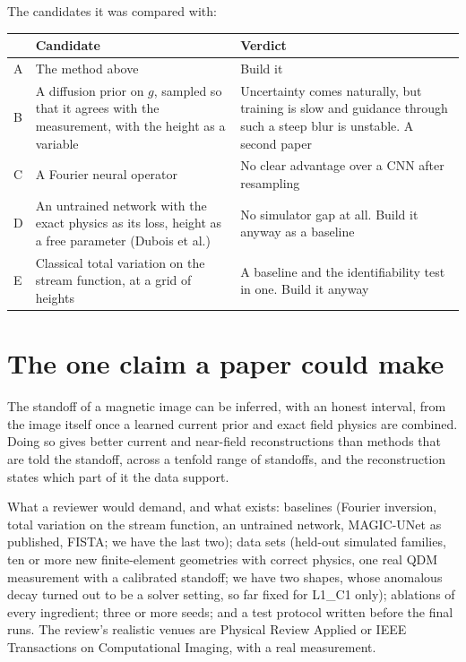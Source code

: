 The candidates it was compared with:

\begin{center}
\small
\begin{tabularx}{\textwidth}{l>{\raggedright\arraybackslash}X>{\raggedright\arraybackslash}p{3.6cm}}
\toprule
 & Candidate & Verdict \\
\midrule
A & The method above & Build it \\
B & A diffusion prior on $g$, sampled so that it agrees with the measurement, with the height as a variable & Uncertainty
comes naturally, but training is slow and guidance through such a steep blur is unstable. A second paper \\
C & A Fourier neural operator & No clear advantage over a CNN after resampling \\
D & An untrained network with the exact physics as its loss, height as a free parameter (Dubois et al.) & No simulator gap
at all. Build it anyway as a baseline \\
E & Classical total variation on the stream function, at a grid of heights & A baseline and the identifiability test in
one. Build it anyway \\
\bottomrule
\end{tabularx}
\end{center}

\section{The one claim a paper could make}

\begin{keyidea}
The standoff of a magnetic image can be inferred, with an honest interval, from the image itself once a learned current
prior and exact field physics are combined. Doing so gives better current and near-field reconstructions than methods
that are told the standoff, across a tenfold range of standoffs, and the reconstruction states which part of it the data
support.
\end{keyidea}

What a reviewer would demand, and what exists: baselines (Fourier inversion, total variation on the stream function, an
untrained network, MAGIC-UNet as published, FISTA; we have the last two); data sets (held-out simulated families, ten or
more new finite-element geometries with correct physics, one real QDM measurement with a calibrated standoff; we have two
shapes, whose anomalous decay turned out to be a solver setting, so far fixed for L1\_C1 only); ablations of every ingredient; three or more seeds; and a test protocol written before
the final runs. The review's realistic venues are Physical Review Applied or IEEE Transactions on Computational Imaging,
with a real measurement.

